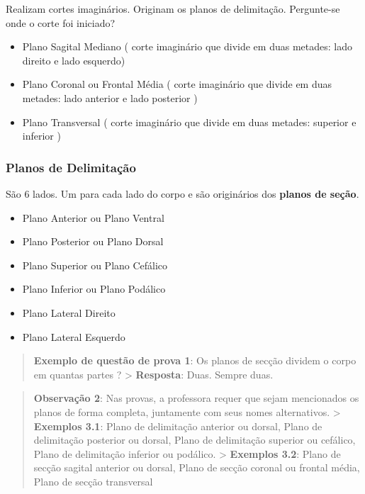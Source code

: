 \documentclass[
]{book}
\providecommand{\tightlist}{%
  \setlength{\itemsep}{0pt}\setlength{\parskip}{0pt}}
\begin{document}
Realizam cortes imaginários. Originam os planos de delimitação. Pergunte-se onde o corte foi iniciado?

\begin{itemize}
\tightlist
\item
  Plano Sagital Mediano ( corte imaginário que divide em duas metades: lado direito e lado esquerdo)
\item
  Plano Coronal ou Frontal Média ( corte imaginário que divide em duas metades: lado anterior e lado posterior )
\item
  Plano Transversal ( corte imaginário que divide em duas metades: superior e inferior )
\end{itemize}

\hypertarget{planos-de-delimitauxe7uxe3o}{%
\subsubsection*{Planos de Delimitação}\label{planos-de-delimitauxe7uxe3o}}

São 6 lados. Um para cada lado do corpo e são originários dos \textbf{planos de seção}.

\begin{itemize}
\tightlist
\item
  Plano Anterior ou Plano Ventral
\item
  Plano Posterior ou Plano Dorsal
\item
  Plano Superior ou Plano Cefálico
\item
  Plano Inferior ou Plano Podálico
\item
  Plano Lateral Direito
\item
  Plano Lateral Esquerdo
\end{itemize}

\begin{quote}
\textbf{Exemplo de questão de prova 1}: Os planos de secção dividem o corpo em quantas partes ?
\textgreater{} \textbf{Resposta}: Duas. Sempre duas.
\end{quote}

\begin{quote}
\textbf{Observação 2}: Nas provas, a professora requer que sejam mencionados os planos de forma completa, juntamente com seus nomes alternativos.
\textgreater{} \textbf{Exemplos 3.1}: Plano de delimitação anterior ou dorsal, Plano de delimitação posterior ou dorsal, Plano de delimitação superior ou cefálico, Plano de delimitação inferior ou podálico.
\textgreater{} \textbf{Exemplos 3.2}: Plano de secção sagital anterior ou dorsal, Plano de secção coronal ou frontal média, Plano de secção transversal
\end{quote}
\end{document}
